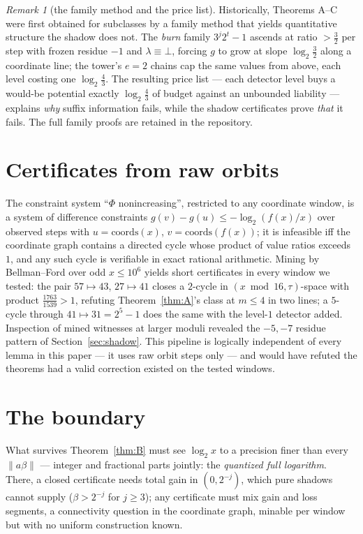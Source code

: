 \documentclass[11pt]{article}
\theoremstyle{definition}
\theoremstyle{remark}
\newtheorem{remark}[theorem]{Remark}
\begin{document}
\begin{remark}[the family method and the price list]\label{rem:price}
Historically, Theorems A--C were first obtained for subclasses by a
family method that yields quantitative structure the shadow does not.
The \emph{burn} family $3^{j}2^{t}-1$ ascends at ratio $>\tfrac32$ per
step with frozen residue $-1$ and $\lambda\equiv\bot$, forcing $g$ to
grow at slope $\log_2\tfrac32$ along a coordinate line; the tower's
$e{=}2$ chains cap the same values from above, each level costing one
$\log_2\tfrac43$. The resulting price list --- each detector level buys
a would-be potential exactly $\log_2\tfrac43$ of budget against an
unbounded liability --- explains \emph{why} suffix information fails,
while the shadow certificates prove \emph{that} it fails. The full
family proofs are retained in the repository.
\end{remark}

\section{Certificates from raw orbits}\label{sec:certificates}

The constraint system ``$\Phi$ nonincreasing'', restricted to any
coordinate window, is a system of difference constraints
$g(v)-g(u)\le-\log_2(f(x)/x)$ over observed steps with
$u=\mathrm{coords}(x)$, $v=\mathrm{coords}(f(x))$; it is infeasible iff
the coordinate graph contains a directed cycle whose product of
value ratios exceeds $1$, and any such cycle is verifiable in exact
rational arithmetic. Mining by Bellman--Ford over odd $x\le10^{6}$
yields short certificates in every window we tested: the pair
$57\mapsto43$, $27\mapsto41$ closes a $2$-cycle in
$(x\bmod16,\tau)$-space with product $\tfrac{1763}{1539}>1$, refuting
Theorem~\ref{thm:A}'s class at $m\le4$ in two lines; a $5$-cycle
through $41\mapsto31=2^{5}-1$ does the same with the level-$1$ detector
added. Inspection of mined witnesses at larger moduli revealed the
$-5,-7$ residue pattern of Section~\ref{sec:shadow}. This pipeline is
logically independent of every lemma in this paper --- it uses raw
orbit steps only --- and would have refuted the theorems had a valid
correction existed on the tested windows.

\section{The boundary}\label{sec:boundary}

What survives Theorem~\ref{thm:B} must see $\log_2x$ to a precision
finer than every $\|a\beta\|$ --- integer and fractional parts jointly:
the \emph{quantized full logarithm}. There, a closed certificate needs
total gain in $(0,2^{-j})$, which pure shadows cannot supply
($\beta>2^{-j}$ for $j\ge3$); any certificate must mix gain and loss
segments, a connectivity question in the coordinate graph, minable per
window but with no uniform construction known.
\end{document}
